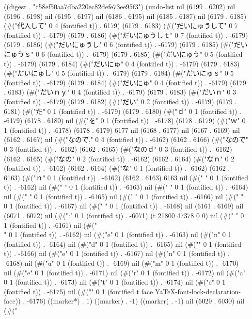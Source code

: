 
((digest . "c58ef50aa7dba220ec82defe73ee95f3") (undo-list nil (6199 . 6202) nil (6196 . 6198) nil (6195 . 6197) nil (6186 . 6195) nil (6185 . 6187) nil (6179 . 6185) (#("代入して" 0 4 (fontified t)) . 6179) (6179 . 6183) (#("だいにゅうして" 0 7 (fontified t)) . -6179) (6179 . 6186) (#("だいにゅうしｔ" 0 7 (fontified t)) . -6179) (6179 . 6186) (#("だいにゅうし" 0 6 (fontified t)) . -6179) (6179 . 6185) (#("だいにゅうｓ" 0 6 (fontified t)) . -6179) (6179 . 6185) (#("だいにゅう" 0 5 (fontified t)) . -6179) (6179 . 6184) (#("だいにゅ" 0 4 (fontified t)) . -6179) (6179 . 6183) (#("だいにゅし" 0 5 (fontified t)) . -6179) (6179 . 6184) (#("だいにゅｓ" 0 5 (fontified t)) . -6179) (6179 . 6184) (#("だいにゅ" 0 4 (fontified t)) . -6179) (6179 . 6183) (#("だいｎｙ" 0 4 (fontified t)) . -6179) (6179 . 6183) (#("だいｎ" 0 3 (fontified t)) . -6179) (6179 . 6182) (#("だい" 0 2 (fontified t)) . -6179) (6179 . 6181) (#("だ" 0 1 (fontified t)) . -6179) (6179 . 6180) (#("ｄ" 0 1 (fontified t)) . -6179) (6178 . 6180) nil (#("を" 0 1 (fontified t)) . -6178) (6178 . 6179) (#("ｗ" 0 1 (fontified t)) . -6178) (6178 . 6179) 6177 nil (6168 . 6177) nil (6167 . 6169) nil (6162 . 6167) nil (#("なので," 0 4 (fontified t)) . -6162) (6162 . 6166) (#("なので" 0 3 (fontified t)) . -6162) (6162 . 6165) (#("なのｄ" 0 3 (fontified t)) . -6162) (6162 . 6165) (#("なの" 0 2 (fontified t)) . -6162) (6162 . 6164) (#("なｎ" 0 2 (fontified t)) . -6162) (6162 . 6164) (#("な" 0 1 (fontified t)) . -6162) (6162 . 6163) (#("ｎ" 0 1 (fontified t)) . -6162) (6162 . 6163) 6163 nil (#(" " 0 1 (fontified t)) . -6162) nil (#(" " 0 1 (fontified t)) . -6163) nil (#(" " 0 1 (fontified t)) . -6164) nil (#(" " 0 1 (fontified t)) . -6165) nil (#(" " 0 1 (fontified t)) . -6166) nil (#(" " 0 1 (fontified t)) . -6167) nil (#(" " 0 1 (fontified t)) . -6168) nil (6161 . 6169) nil (6071 . 6072) nil (#(":" 0 1 (fontified t)) . -6071) (t 21800 47378 0 0) nil (#("
" 0 1 (fontified t)) . -6161) nil (#("\\" 0 1 (fontified t)) . -6162) nil (#("e" 0 1 (fontified t)) . -6163) nil (#("n" 0 1 (fontified t)) . -6164) nil (#("d" 0 1 (fontified t)) . -6165) nil (#("{" 0 1 (fontified t)) . -6166) nil (#("e" 0 1 (fontified t)) . -6167) nil (#("n" 0 1 (fontified t)) . -6168) nil (#("u" 0 1 (fontified t)) . -6169) nil (#("m" 0 1 (fontified t)) . -6170) nil (#("e" 0 1 (fontified t)) . -6171) nil (#("r" 0 1 (fontified t)) . -6172) nil (#("a" 0 1 (fontified t)) . -6173) nil (#("t" 0 1 (fontified t)) . -6174) nil (#("e" 0 1 (fontified t)) . -6175) nil (#("}" 0 1 (fontified t face YaTeX-font-lock-declaration-face)) . -6176) ((marker*) . 1) ((marker) . -1) ((marker) . -1) nil (6029 . 6030) nil (#("
